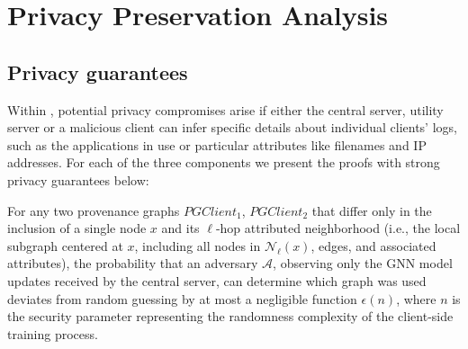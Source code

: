 \section{Privacy Preservation Analysis}
\label{sec:privacy}




\subsection{Privacy guarantees}

Within \Sys, potential privacy compromises arise if either the central server, utility server or a malicious client can infer specific details about individual clients' logs, such as the applications in use or particular attributes like filenames and IP addresses. For each of the three components we present the proofs with strong privacy guarantees below:

\renewcommand{\thetheorem}{\arabic{theorem}}

\begin{theorem}
    For any two provenance graphs \(PGClient_1\), \(PGClient_2\) that differ only in the inclusion of a single node \(x\) and its \(\ell\)-hop attributed neighborhood (i.e., the local subgraph centered at \(x\), including all nodes in \(\mathcal{N}_\ell(x)\), edges, and associated attributes), the probability that an adversary \(\mathcal{A}\), observing only the GNN model updates received by the central server, can determine which graph was used deviates from random guessing by at most a negligible function \(\epsilon(n)\), where \(n\) is the security parameter representing the randomness complexity of the client-side training process.
    \end{theorem}
    
